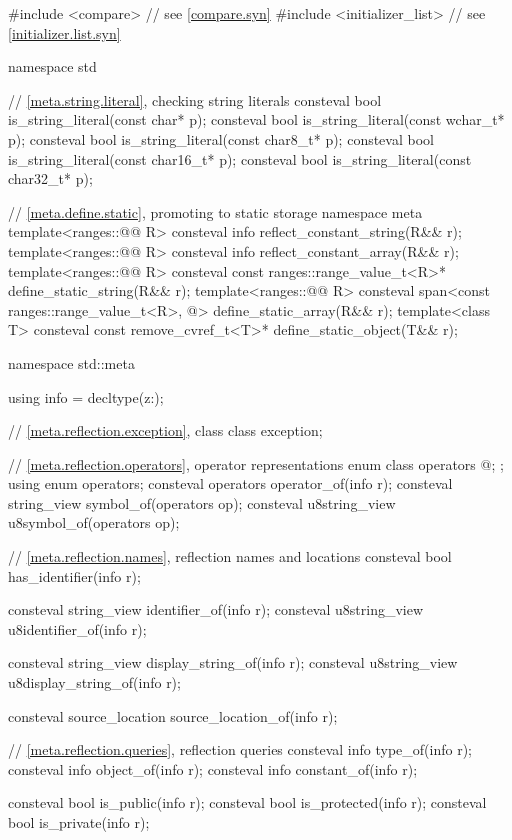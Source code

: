 %
\begin{codeblock}
#include <compare>              // see \ref{compare.syn}
#include <initializer_list>     // see \ref{initializer.list.syn}

namespace std {
  // \ref{meta.string.literal}, checking string literals
  consteval bool is_string_literal(const char* p);
  consteval bool is_string_literal(const wchar_t* p);
  consteval bool is_string_literal(const char8_t* p);
  consteval bool is_string_literal(const char16_t* p);
  consteval bool is_string_literal(const char32_t* p);

  // \ref{meta.define.static}, promoting to static storage
  namespace meta {
    template<ranges::@@ R>
      consteval info reflect_constant_string(R&& r);
    template<ranges::@@ R>
      consteval info reflect_constant_array(R&& r);
  }
  template<ranges::@@ R>
    consteval const ranges::range_value_t<R>* define_static_string(R&& r);
  template<ranges::@@ R>
    consteval span<const ranges::range_value_t<R>, @\seebelow@> define_static_array(R&& r);
  template<class T>
    consteval const remove_cvref_t<T>* define_static_object(T&& r);
}

namespace std::meta {
  using info = decltype(^^::);

  // \ref{meta.reflection.exception}, class 
  class exception;

  // \ref{meta.reflection.operators}, operator representations
  enum class operators {
    @\seebelow@;
  };
  using enum operators;
  consteval operators operator_of(info r);
  consteval string_view symbol_of(operators op);
  consteval u8string_view u8symbol_of(operators op);

  // \ref{meta.reflection.names}, reflection names and locations
  consteval bool has_identifier(info r);

  consteval string_view identifier_of(info r);
  consteval u8string_view u8identifier_of(info r);

  consteval string_view display_string_of(info r);
  consteval u8string_view u8display_string_of(info r);

  consteval source_location source_location_of(info r);

  // \ref{meta.reflection.queries}, reflection queries
  consteval info type_of(info r);
  consteval info object_of(info r);
  consteval info constant_of(info r);

  consteval bool is_public(info r);
  consteval bool is_protected(info r);
  consteval bool is_private(info r);

}
\end{codeblock}
